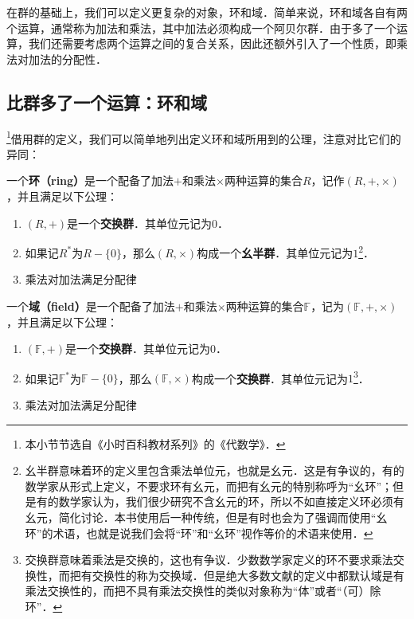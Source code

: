 

在群的基础上，我们可以定义更复杂的对象，环和域．简单来说，环和域各自有两个运算，通常称为加法和乘法，其中加法必须构成一个阿贝尔群．由于多了一个运算，我们还需要考虑两个运算之间的复合关系，因此还额外引入了一个性质，即乘法对加法的分配性．

\subsection{比群多了一个运算：环和域}

\footnote{本小节节选自《小时百科教材系列》的《代数学》．}借用群的定义，我们可以简单地列出定义环和域所用到的公理，注意对比它们的异同：

\begin{definition}{}
一个\textbf{环（ring）}是一个配备了加法$+$和乘法$\times$两种运算的集合$R$，记作$(R, +, \times)$，并且满足以下公理：
\begin{enumerate}
    \item $(R, +)$是一个\textbf{交换群}．其单位元记为$0$．
    \item 如果记$R^*$为$R-\{0\}$，那么$(R, \times)$构成一个\textbf{幺半群}．其单位元记为$1$\footnote{幺半群意味着环的定义里包含乘法单位元，也就是幺元．这是有争议的，有的数学家从形式上定义，不要求环有幺元，而把有幺元的特别称呼为“幺环”；但是有的数学家认为，我们很少研究不含幺元的环，所以不如直接定义环必须有幺元，简化讨论．本书使用后一种传统，但是有时也会为了强调而使用“幺环”的术语，也就是说我们会将“环”和“幺环”视作等价的术语来使用．}．
    \item 乘法对加法满足分配律
\end{enumerate}
\end{definition}

\begin{definition}{}
一个\textbf{域（field）}是一个配备了加法$+$和乘法$\times$两种运算的集合$\mathbb{F}$，记为$(\mathbb{F}, +, \times)$，并且满足以下公理：

\begin{enumerate}
    \item $(\mathbb{F}, +)$是一个\textbf{交换群}．其单位元记为$0$．
    \item 如果记$\mathbb{F}^*$为$\mathbb{F}-\{0\}$，那么$(\mathbb{F}, \times)$构成一个\textbf{交换群}．其单位元记为$1$\footnote{交换群意味着乘法是交换的，这也有争议．少数数学家定义的环不要求乘法交换性，而把有交换性的称为交换域．但是绝大多数文献的定义中都默认域是有乘法交换性的，而把不具有乘法交换性的类似对象称为“体”或者“（可）除环”．}．
    \item 乘法对加法满足分配律
\end{enumerate}
\end{definition}


